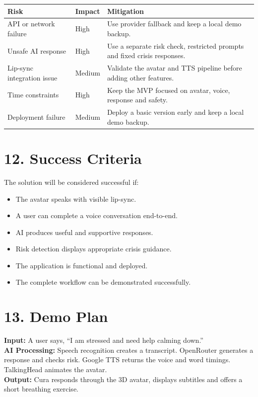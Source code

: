 \documentclass[9pt,a4paper]{article}
\begin{document}
\begin{tabularx}{\textwidth}{@{}p{3.4cm}p{2cm}Y@{}}
\textbf{Risk} & \textbf{Impact} & \textbf{Mitigation} \\
\hline
API or network failure & High & Use provider fallback and keep a local demo backup. \\
Unsafe AI response & High & Use a separate risk check, restricted prompts and fixed crisis responses. \\
Lip-sync integration issue & Medium & Validate the avatar and TTS pipeline before adding other features. \\
Time constraints & High & Keep the MVP focused on avatar, voice, response and safety. \\
Deployment failure & Medium & Deploy a basic version early and keep a local demo backup. \\
\end{tabularx}

\section*{12. Success Criteria}

The solution will be considered successful if:
\begin{itemize}
  \item [ ] The avatar speaks with visible lip-sync.
  \item [ ] A user can complete a voice conversation end-to-end.
  \item [ ] AI produces useful and supportive responses.
  \item [ ] Risk detection displays appropriate crisis guidance.
  \item [ ] The application is functional and deployed.
  \item [ ] The complete workflow can be demonstrated successfully.
\end{itemize}

\section*{13. Demo Plan}

\textbf{Input:} A user says, ``I am stressed and need help calming down.''\\
\textbf{AI Processing:} Speech recognition creates a transcript. OpenRouter
generates a response and checks risk. Google TTS returns the voice and word
timings. TalkingHead animates the avatar.\\
\textbf{Output:} Cura responds through the 3D avatar, displays subtitles and
offers a short breathing exercise.
\end{document}
